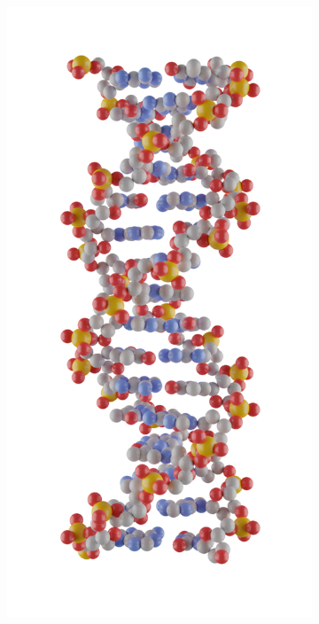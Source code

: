 \begin{figure}[ht]
  \begin{centering}
  \begin{subfigure}[t]{\dimexpr.3\linewidth-1.3em\relax}
  \centering
  \vspace{-0.9cm}
  \includegraphics[width=.9\linewidth,valign=t]{Figures/ballnstick.png}
  \end{subfigure}%

\end{centering}
\end{figure}
